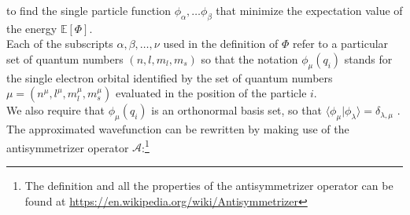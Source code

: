 to find the single particle function $\phi_{\alpha}, \dots \phi_{\beta}$ that minimize the expectation value of the energy $\mathbb{E}[\Phi]$. \\
Each of the subscripts $\alpha, \beta, \dots, \nu$ used in the definition of $\Phi$ refer to a particular set of quantum numbers $(n, l, m_l, m_s)$ so that the notation $\phi_{\mu}(q_i)$ stands for the single electron orbital identified by the set of quantum numbers $\mu = (n^\mu, l^\mu, m_l^\mu, m_s^\mu)$ evaluated in the position of the particle $i$. \\
We also require that ${\phi_{\mu}(q_i)}$ is an orthonormal basis set, so that $\langle \phi_{\mu}|\phi_{\lambda}\rangle =\delta_{\lambda, \mu} $ .\\
The approximated wavefunction can be rewritten by making use of the antisymmetrizer operator $\mathcal{A}$:\footnote{The definition and all the properties of the antisymmetrizer operator can be found at \href{https://en.wikipedia.org/wiki/Antisymmetrizer}{https://en.wikipedia.org/wiki/Antisymmetrizer}}

